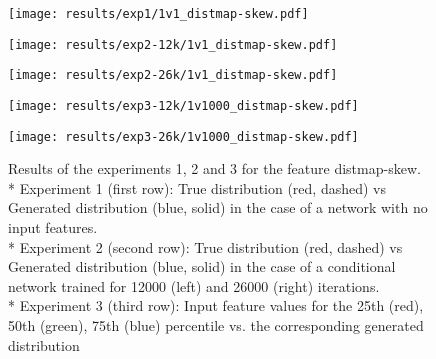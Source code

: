 \begin{figure}[h!]
	\begin{minipage}{0.5\linewidth}
		\texttt{[image: results/exp1/1v1\_distmap-skew.pdf]}
	\end{minipage}
	
	\begin{minipage}{0.5\linewidth}
		\texttt{[image: results/exp2-12k/1v1\_distmap-skew.pdf]}
	\end{minipage}
	\begin{minipage}{0.5\linewidth}
		\texttt{[image: results/exp2-26k/1v1\_distmap-skew.pdf]}
	\end{minipage}
	
	\begin{minipage}{0.5\linewidth}
		\texttt{[image: results/exp3-12k/1v1000\_distmap-skew.pdf]}
	\end{minipage}
	\begin{minipage}{0.5\linewidth}
		\texttt{[image: results/exp3-26k/1v1000\_distmap-skew.pdf]}
	\end{minipage}
	\caption[ Results: Input feature distmap-skew]{ Results of the experiments 1, 2 and 3 for the feature distmap-skew. \\* Experiment 1 (first row): True distribution (red, dashed) vs Generated distribution (blue, solid) in the case of a network with no input features. \\* Experiment 2 (second row): True distribution (red, dashed) vs Generated distribution (blue, solid) in the case of a conditional network trained for 12000 (left) and 26000 (right) iterations. \\* Experiment 3 (third row): Input feature values for the 25th (red), 50th (green), 75th (blue) percentile vs. the corresponding generated distribution}
	\label{fig:results_distmap-skew}
\end{figure}
